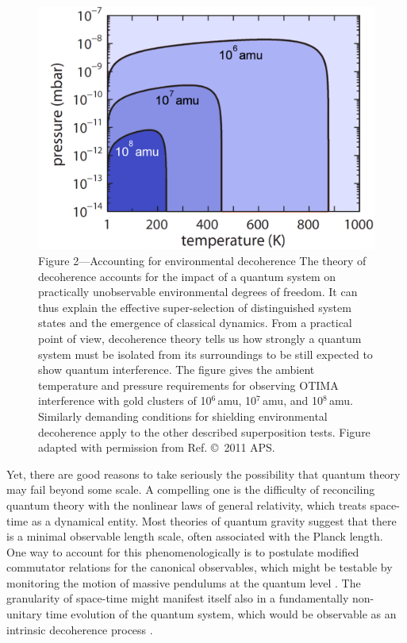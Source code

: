 \documentclass[12pt]{article}
\begin{document}
\begin{figure}
\includegraphics[width=0.8\columnwidth]{Fig2.pdf}
\\
\small
{Figure 2---Accounting for environmental decoherence}
The theory of decoherence accounts for the impact of a quantum system on practically unobservable environmental degrees of freedom\cite{Joos2003,Zurek2003}. It can thus explain the effective super-selection of distinguished system states and the emergence of classical dynamics. From a practical point of view, decoherence theory  tells us how strongly a quantum system must be isolated from its surroundings to be still  expected to show quantum interference. The figure gives the ambient temperature and pressure requirements for observing OTIMA interference with gold clusters of 10$^6$\,amu, 10$^7$\,amu, and 10$^8$\,amu. Similarly demanding conditions for shielding environmental decoherence apply to the other described superposition tests. Figure adapted with permission from Ref.  \copyright\ 2011 APS.
\end{figure} 

Yet, there are good reasons to take seriously the possibility that
quantum theory may fail beyond some scale. A compelling one is the difficulty of reconciling quantum theory with the nonlinear laws of general relativity, which treats space-time as a dynamical entity. Most theories of quantum gravity
suggest that there is a minimal observable length scale, often associated with the Planck length. One way to account for this phenomenologically is to postulate modified commutator relations for the canonical observables,
which might be testable by monitoring the motion of massive pendulums at the quantum level \cite{Abbott2009,PhysRevLett.101.221301, PhysRevD.86.085017, pikovski2012probing, marin2012gravitational}.
The granularity of space-time might  manifest itself also
in a fundamentally non-unitary time evolution of the quantum system, which would be  observable as an intrinsic decoherence process \cite{Percival1997,PhysRevLett.93.240401,Milburn-intrinsic2006,Wang2006a}.
\end{document}
